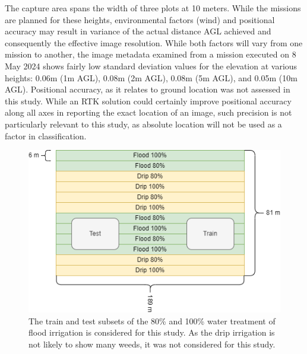 \documentclass[letterpaper]{report}
\begin{document}
%
The capture area spans the width of three plots at 10 meters. While the missions are planned for these heights, environmental factors (wind) and positional accuracy may result in variance of the actual distance AGL achieved and consequently the effective image resolution. While both factors will vary from one mission to another, the image metadata examined from a mission executed on 8 May 2024 shows fairly low standard deviation values for the elevation  at various heights: 0.06m (1m AGL), 0.08m (2m AGL), 0.08m (5m AGL), and 0.05m (10m AGL). Positional accuracy, as it relates to ground location was not assessed in this study. While an RTK solution could certainly improve positional accuracy along all axes in reporting the exact location of an image, such precision is not particularly relevant to this study, as absolute location will not be used as a factor in classification.

\begin{figure}[h!]
	\centering
	\includegraphics[width=0.8\linewidth]{./figures/test-area.png}
	\caption[Field layout for image acquisition]{The train and test subsets of the 80\% and 100\% water treatment of  flood irrigation is considered for this study. As the drip irrigation is not likely to show many weeds, it was not considered for this study.}
	\label{fig:field-layout}
\end{figure}
\end{document}

